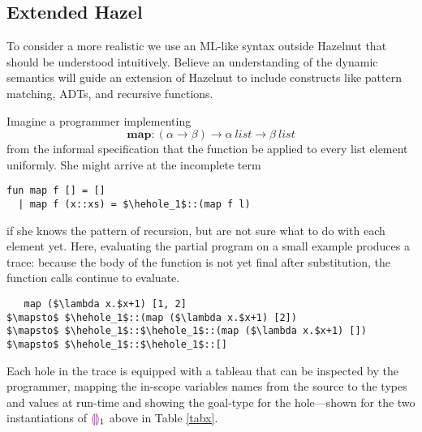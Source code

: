 \subsection{Extended Hazel}
To consider a more realistic we use an ML-like syntax outside Hazelnut that
should be understood intuitively. Believe an understanding of the dynamic
semantics will guide an extension of Hazelnut to include constructs like
pattern matching, ADTs, and recursive functions.

Imagine a programmer implementing $$\mathbf{map} : (\alpha \to \beta) \to
\alpha ~\mathit{list} \to \beta ~\mathit{list}$$ from the informal
specification that the function be applied to every list element uniformly.
She might arrive at the incomplete term
\begin{lstlisting}
fun map f [] = []
  | map f (x::xs) = $\hehole_1$::(map f l)
\end{lstlisting}
if she knows the pattern of recursion, but are not sure what to do with
each element yet. Here, evaluating the partial program on a small example
produces a trace: because the body of the function is not yet final after
substitution, the function calls continue to evaluate.
\begin{lstlisting}
   map ($\lambda x.$x+1) [1, 2]
$\mapsto$ $\hehole_1$::(map ($\lambda x.$x+1) [2])
$\mapsto$ $\hehole_1$::$\hehole_1$::(map ($\lambda x.$x+1) [])
$\mapsto$ $\hehole_1$::$\hehole_1$::[]
\end{lstlisting}
Each hole in the trace is equipped with a tableau that can be inspected by
the programmer, mapping the in-scope variables names from the source to the
types and values at run-time and showing the goal-type for the hole---shown
for the two instantiations of $\textcolor{violet}{\llparenthesis}\textcolor{violet}{\rrparenthesis}_1$ above in Table \ref{tabx}.

